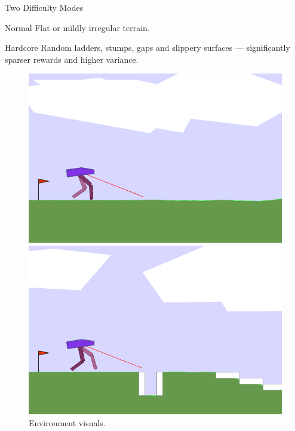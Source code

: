 \documentclass[10pt,aspectratio=169]{beamer}
\begin{document}
\begin{frame}{Two Difficulty Modes}
\begin{block}{Normal}
  Flat or mildly irregular terrain.
\end{block}
\begin{block}{Hardcore}
  Random ladders, stumps, gaps and slippery surfaces — significantly sparser rewards and higher variance.
\end{block}
\begin{figure}[h]
  \centering
  \begin{minipage}{0.375\textwidth}
    \centering
    \includegraphics[width=\textwidth]{normal_mode_placeholder.png}
  \end{minipage}\hspace{0.05\textwidth}%
  \begin{minipage}{0.375\textwidth}
    \centering
    \includegraphics[width=\textwidth]{hardcore_mode_placeholder.png}
  \end{minipage}
  \caption{Environment visuals.}
\end{figure}
\end{frame}
\end{document}
